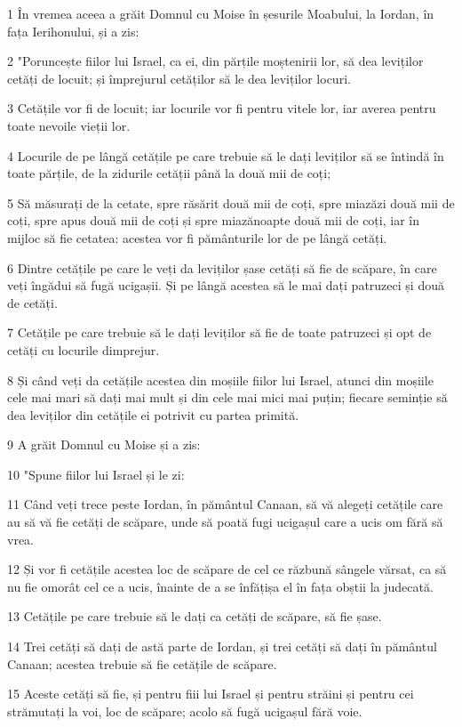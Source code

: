 \par 1 În vremea aceea a grăit Domnul cu Moise în șesurile Moabului, la Iordan, în fața Ierihonului, și a zis:
\par 2 "Poruncește fiilor lui Israel, ca ei, din părțile moștenirii lor, să dea leviților cetăți de locuit; și împrejurul cetăților să le dea leviților locuri.
\par 3 Cetățile vor fi de locuit; iar locurile vor fi pentru vitele lor, iar averea pentru toate nevoile vieții lor.
\par 4 Locurile de pe lângă cetățile pe care trebuie să le dați leviților să se întindă în toate părțile, de la zidurile cetății până la două mii de coți;
\par 5 Să măsurați de la cetate, spre răsărit două mii de coți, spre miazăzi două mii de coți, spre apus două mii de coți și spre miazănoapte două mii de coți, iar în mijloc să fie cetatea: acestea vor fi pământurile lor de pe lângă cetăți.
\par 6 Dintre cetățile pe care le veți da leviților șase cetăți să fie de scăpare, în care veți îngădui să fugă ucigașii. Și pe lângă acestea să le mai dați patruzeci și două de cetăți.
\par 7 Cetățile pe care trebuie să le dați leviților să fie de toate patruzeci și opt de cetăți cu locurile dimprejur.
\par 8 Și când veți da cetățile acestea din moșiile fiilor lui Israel, atunci din moșiile cele mai mari să dați mai mult și din cele mai mici mai puțin; fiecare seminție să dea leviților din cetățile ei potrivit cu partea primită.
\par 9 A grăit Domnul cu Moise și a zis:
\par 10 "Spune fiilor lui Israel și le zi:
\par 11 Când veți trece peste Iordan, în pământul Canaan, să vă alegeți cetățile care au să vă fie cetăți de scăpare, unde să poată fugi ucigașul care a ucis om fără să vrea.
\par 12 Și vor fi cetățile acestea loc de scăpare de cel ce răzbună sângele vărsat, ca să nu fie omorât cel ce a ucis, înainte de a se înfățișa el în fața obștii la judecată.
\par 13 Cetățile pe care trebuie să le dați ca cetăți de scăpare, să fie șase.
\par 14 Trei cetăți să dați de astă parte de Iordan, și trei cetăți să dați în pământul Canaan; acestea trebuie să fie cetățile de scăpare.
\par 15 Aceste cetăți să fie, și pentru fiii lui Israel și pentru străini și pentru cei strămutați la voi, loc de scăpare; acolo să fugă ucigașul fără voie.

